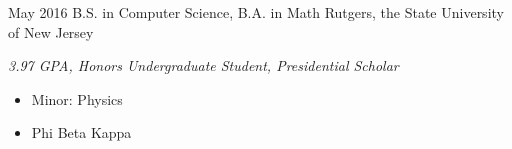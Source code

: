 \documentclass[]{friggeri-mlg-cv} %
\begin{document}
\begin{entrylist}
\entry
{May 2016}
{B.S. {\normalfont in Computer Science,} B.A. {\normalfont in Math}}
{Rutgers, the State University of New Jersey}
{\emph{3.97 GPA, Honors Undergraduate Student, Presidential Scholar}
\begin{itemize}[leftmargin=*,topsep=0pt]
\item Minor: Physics
\item Phi Beta Kappa
\end{itemize}}
\\
\end{entrylist}
\end{document}
